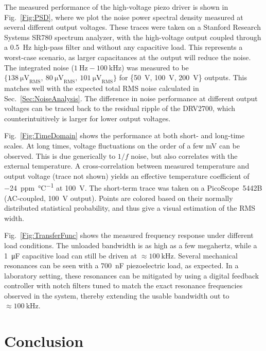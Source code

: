 \documentclass[aip,rsi,reprint]{revtex4-1} %
\begin{document}
The measured performance of the high-voltage piezo driver is shown in Fig.~\ref{Fig:PSD}, where we plot the noise power spectral density measured at several different output voltages.
These traces were taken on a Stanford Research Systems SR780 spectrum analyzer, with the high-voltage output coupled through a \SI{0.5}{\hertz} high-pass filter and without any capacitive load.
This represents a worst-case scenario, as larger capacitances at the output will reduce the noise.
The integrated noise ($\SI{1}{\hertz} - \SI{100}{\kilo\hertz}$) was measured to be $\{\SI{138}{\micro\volt}_\text{RMS},~\SI{80}{\micro\volt}_\text{RMS},~\SI{101}{\micro\volt}_\text{RMS}\}$ for \{\SI{50}{\volt}, \SI{100}{\volt}, \SI{200}{\volt}\} outputs. 
This matches well with the expected total RMS noise calculated in Sec.~\ref{Sec:NoiseAnalysis}.
The difference in noise performance at different output voltages can be traced back to the residual ripple of the DRV2700, which counterintuitively is larger for lower output voltages.


Fig.~\ref{Fig:TimeDomain} shows the performance at both short- and long-time scales.
At long times, voltage fluctuations on the order of a few \si{\milli\volt} can be observed.
This is due generically to $1/f$ noise, but also correlates with the external temperature.
A cross-correlation between measured temperature and output voltage (trace not shown) yields an effective temperature coefficient of \SI[per-mode=symbol]{-24}{ppm\per\celsius} at \SI{100}{\volt}.
The short-term trace was taken on a PicoScope~5442B (AC-coupled, \SI{100}{\volt} output).
Points are colored based on their normally distributed statistical probability, and thus give a visual estimation of the RMS width.


Fig.~\ref{Fig:TransferFunc} shows the measured frequency response under different load conditions. The unloaded bandwidth is as high as a few megahertz, while a \SI{1}{\micro\farad} capacitive load can still be driven at $\approx\SI{100}{\kilo\hertz}$. 
Several mechanical resonances can be seen with a \SI{700}{\nano\farad} piezoelectric load, as expected.
In a laboratory setting, these resonances can be mitigated by using a digital feedback controller with notch filters tuned to match the exact resonance frequencies observed in the system\cite{Ryou2016a}, thereby extending the usable bandwidth out to $\approx\SI{100}{\kilo\hertz}$.



\section{Conclusion}
\label{Sec:Conclusion}
\end{document}
